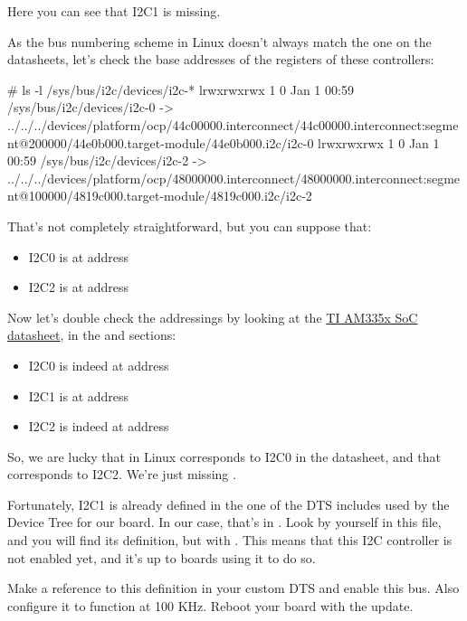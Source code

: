 Here you can see that I2C1 is missing.

As the bus numbering scheme in Linux doesn't always match the one
on the datasheets, let's check the base addresses of the registers
of these controllers:

\begin{bashinput}
# ls -l /sys/bus/i2c/devices/i2c-*
lrwxrwxrwx    1         0 Jan  1 00:59 /sys/bus/i2c/devices/i2c-0 -> ../../../devices/platform/ocp/44c00000.interconnect/44c00000.interconnect:segment@200000/44e0b000.target-module/44e0b000.i2c/i2c-0
lrwxrwxrwx    1         0 Jan  1 00:59 /sys/bus/i2c/devices/i2c-2 -> ../../../devices/platform/ocp/48000000.interconnect/48000000.interconnect:segment@100000/4819c000.target-module/4819c000.i2c/i2c-2
\end{bashinput}

That's not completely straightforward, but you can suppose that:
\begin{itemize}
\item I2C0 is at address 
\item I2C2 is at address 
\end{itemize}

Now let's double check the addressings by looking at the
\href{https://www.ti.com/lit/ug/spruh73q/spruh73q.pdf}{TI AM335x SoC
datasheet}, in the  and  sections:

\begin{itemize}
\item I2C0 is indeed at address 
\item I2C1 is at address 
\item I2C2 is indeed at address 
\end{itemize}

So, we are lucky that  in Linux corresponds to I2C0 in the
datasheet, and that  corresponds to I2C2.
We're just missing .

Fortunately, I2C1 is already defined in the one of the DTS includes
used by the Device Tree for our board. In our case, that's in
. Look by yourself in this
file, and you will find its definition, but with . This means that this I2C controller is not enabled yet,
and it's up to boards using it to do so.

Make a reference to this definition in your custom DTS and enable this
bus. Also configure it to function at 100 KHz. Reboot your board with
the update.


